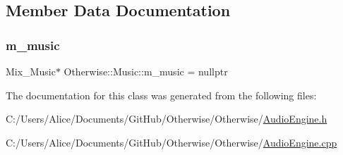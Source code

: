 \subsection{Member Data Documentation}
\mbox{\label{class_otherwise_1_1_music_aef72ab0f5a928a12ac16c0f0e8e1e1b7}} 
\subsubsection{\texorpdfstring{m\+\_\+music}{m\_music}}
{\footnotesize\ttfamily Mix\+\_\+\+Music$\ast$ Otherwise\+::\+Music\+::m\+\_\+music = nullptr\hspace{0.3cm}{\ttfamily [private]}}



The documentation for this class was generated from the following files\+:\begin{DoxyCompactItemize}
\item 
C\+:/\+Users/\+Alice/\+Documents/\+Git\+Hub/\+Otherwise/\+Otherwise/\hyperlink{_audio_engine_8h}{Audio\+Engine.\+h}\item 
C\+:/\+Users/\+Alice/\+Documents/\+Git\+Hub/\+Otherwise/\+Otherwise/\hyperlink{_audio_engine_8cpp}{Audio\+Engine.\+cpp}\end{DoxyCompactItemize}
